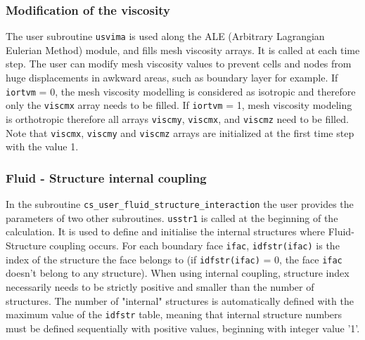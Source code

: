 {%
\subsubsection{Modification of the viscosity}

The user subroutine \texttt{usvima} is used along the ALE (Arbitrary Lagrangian Eulerian
 Method) module, and fills mesh viscosity arrays. It is called at each time step.
The user can modify mesh viscosity values to prevent cells and nodes from huge
 displacements in awkward areas, such as boundary layer for example.
If \texttt{iortvm} = 0, the mesh viscosity modelling is considered as isotropic and
 therefore only the \texttt{viscmx} array needs to be filled.
If \texttt{iortvm} = 1, mesh viscosity modeling is orthotropic therefore all arrays
 \texttt{viscmy}, \texttt{viscmx}, and \texttt{viscmz} need to be filled.
Note that \texttt{viscmx}, \texttt{viscmy} and \texttt{viscmz} arrays are initialized
 at the first time step with the value 1.

\subsubsection{Fluid - Structure internal coupling}\label{sec:ALE}

In the subroutine \texttt{cs\_user\_fluid\_structure\_interaction} the user provides the parameters of two other subroutines.
\texttt{usstr1} is called at the beginning of the calculation. It is used to define
 and initialise the internal structures where Fluid-Structure coupling occurs.
For each boundary face \texttt{ifac}, \texttt{idfstr(ifac)} is the index of the structure
 the face belongs to (if \texttt{idfstr(ifac)} = 0, the face \texttt{ifac} doesn't belong
 to any structure). When using internal coupling, structure index necessarily needs to be
 strictly positive and smaller than the number of structures. The number of "internal" structures is automatically defined with the maximum
 value of the \texttt{idfstr} table, meaning that internal structure numbers must be defined
 sequentially with positive values, beginning with integer value '1'.

}
